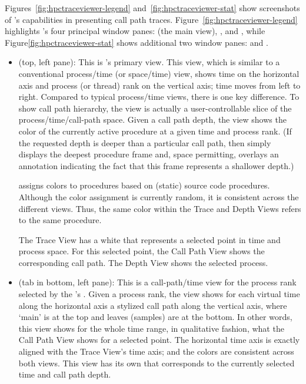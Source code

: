 Figures~\ref{fig:hpctraceviewer-legend} and~\ref{fig:hpctraceviewer-stat} show screenshots of \hpctraceviewer{}'s capabilities in presenting call path traces.
Figure~\ref{fig:hpctraceviewer-legend} highlights \hpctraceviewer{}'s four principal window panes: \traceview (the main view), \depthview, \callview{} and \miniview, 
while Figure\ref{fig:hpctraceviewer-stat} shows additional two window panes: \summaryview{} and \statview.

\begin{itemize}
\item \textbf{\traceview} (top, left pane):
  This is \hpctraceviewer{}'s primary view.
  This view, which is similar to a conventional process/time (or space/time) view, shows time on the horizontal axis and process (or thread) rank on the vertical axis; time moves from left to right.
  Compared to typical process/time views, there is one key difference.
  To show call path hierarchy, the view is actually a user-controllable slice of the process/time/call-path space.
  Given a call path depth, the view shows the color of the currently active procedure at a given time and process rank.
  (If the requested depth is deeper than a particular call path, then \hpctraceviewer{} simply displays the deepest procedure frame and, space permitting, overlays an annotation indicating the fact that this frame represents a shallower depth.)

  \hpctraceviewer{} assigns colors to procedures based on (static) source code procedures.
  Although the color assignment is currently random, it is consistent across the different views.
  Thus, the same color within the Trace and Depth Views refers to the same procedure.

  The Trace View has a white \crosshair{} that represents a selected point in time and process space.
  For this selected point, the Call Path View shows the corresponding call path.
  The Depth View shows the selected process.

\item \textbf{\depthview} (tab in bottom, left pane):
  This is a call-path/time view for the process rank selected by the \traceview's \crosshair{}.
  Given a process rank, the view shows for each virtual time along the horizontal axis a stylized call path along the vertical axis, where `main' is at the top and leaves (samples) are at the bottom.
  In other words, this view shows for the whole time range, in qualitative fashion, what the Call Path View shows for a selected point.
  The horizontal time axis is exactly aligned with the Trace View's time axis; and the colors are consistent across both views.
  This view has its own \crosshair{} that corresponds to the currently selected time and call path depth.


\end{itemize}
